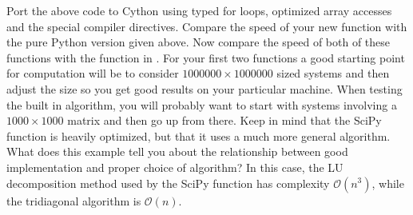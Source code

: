 \begin{problem}
Port the above code to Cython using typed for loops, optimized array accesses and the special compiler directives.
Compare the speed of your new function with the pure Python version given above.
Now compare the speed of both of these functions with the  function in .
For your first two functions a good starting point for computation will be to consider $1000000 \times 1000000$ sized systems and then adjust the size so you get good results on your particular machine.
When testing the built in algorithm, you will probably want to start with systems involving a $1000 \times 1000$ matrix and then go up from there.
Keep in mind that the SciPy function is heavily optimized, but that it uses a much more general algorithm.
What does this example tell you about the relationship between good implementation and proper choice of algorithm?
In this case, the LU decomposition method used by the SciPy function has complexity $\mathcal{O}\left( n^3 \right)$, while the tridiagonal algorithm is $\mathcal{O}\left( n \right)$.
\end{problem}
